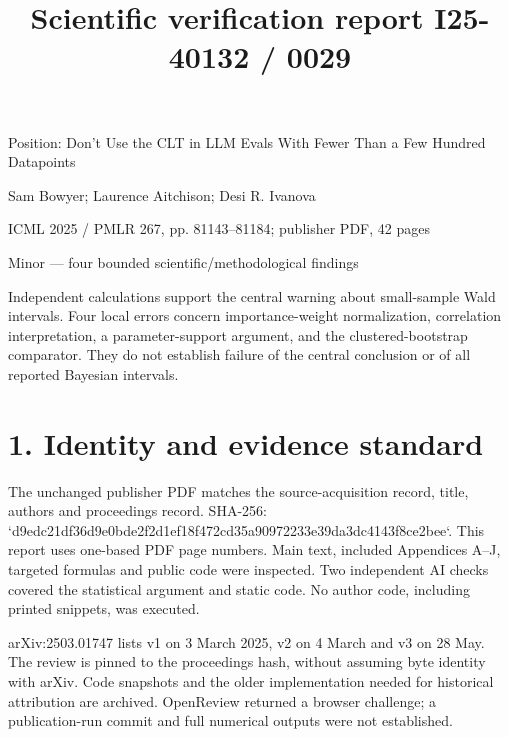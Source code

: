 \documentclass[10pt]{article}
\title{Scientific verification report
I25-40132 / 0029}
\author{}
\date{}
\begin{document}
\maketitle
Position: Don’t Use the CLT in LLM Evals With Fewer Than a Few Hundred Datapoints\par
Sam Bowyer; Laurence Aitchison; Desi R. Ivanova\par
ICML 2025 / PMLR 267, pp. 81143–81184; publisher PDF, 42 pages\par
Minor — four bounded scientific/methodological findings\par
Independent calculations support the central warning about small-sample Wald intervals. Four local errors concern importance-weight normalization, correlation interpretation, a parameter-support argument, and the clustered-bootstrap comparator. They do not establish failure of the central conclusion or of all reported Bayesian intervals.\par
\section*{1. Identity and evidence standard}
The unchanged publisher PDF matches the source-acquisition record, title, authors and proceedings record. SHA-256: `d9edc21df36d9e0bde2f2d1ef18f472cd35a90972233e39da3dc4143f8ce2bee`. This report uses one-based PDF page numbers. Main text, included Appendices A–J, targeted formulas and public code were inspected. Two independent AI checks covered the statistical argument and static code. No author code, including printed snippets, was executed.\par
arXiv:2503.01747 lists v1 on 3 March 2025, v2 on 4 March and v3 on 28 May. The review is pinned to the proceedings hash, without assuming byte identity with arXiv. Code snapshots and the older implementation needed for historical attribution are archived. OpenReview returned a browser challenge; a publication-run commit and full numerical outputs were not established.\par
\end{document}
